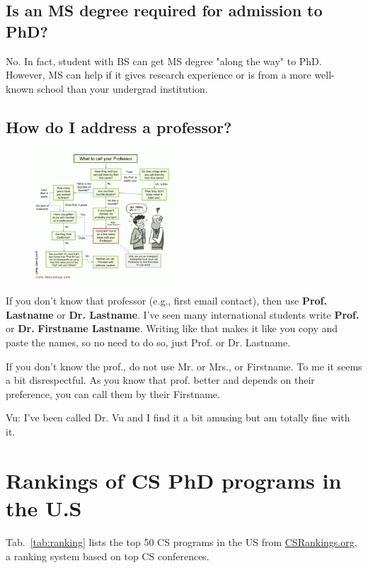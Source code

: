 \documentclass[11pt]{article}
\newenvironment{commentbox}{
 \small
    \begin{cbox}
 }{
   \end{cbox}
}
\begin{document}
\subsection{Is an MS degree required for admission to PhD?}
No. In fact, student with BS can get MS degree "along the way" to PhD.  However, MS can help if it gives research experience or is from a more well-known school than your undergrad institution.
    
\subsection{How do I address a professor?}

\begin{figure}
    \vspace{-0.3in}
      \begin{center}
        \includegraphics[width=0.47\textwidth]{c5.png}
      \end{center}
    \vspace{-0.6in}
    \end{figure}
If you don't know that professor (e.g., first email contact), then use \textbf{Prof. Lastname} or \textbf{Dr. Lastname}. I've seen many international students write \textbf{Prof.} or \textbf{Dr.} \textbf{Firstname Lastname}.  Writing like that makes it like you copy and paste the names, so no need to do so,  just Prof. or Dr. Lastname.
        
If you don't know the prof., do not use Mr. or Mrs., or Firstname. To me it seems a bit disrespectful. As you know that prof. better and depends on their preference, you can call them by their Firstname.


\begin{commentbox}
    Vu: I've been called Dr. Vu and I find it a bit amusing but am totally fine with it.
\end{commentbox}

\section{Rankings of CS PhD programs in the U.S}\label{sec:ranking}
  Tab.~\ref{tab:ranking} lists the top 50 CS programs in the US from \href{https://www.csrankings.org}{CSRankings.org}, a ranking system  based on top CS conferences.
  
\end{document}
